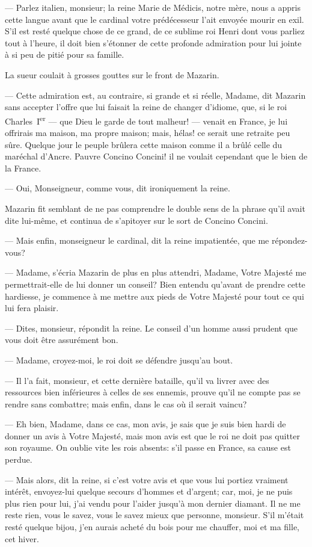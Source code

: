 — Parlez italien, monsieur; la reine Marie de Médicis, notre mère, nous a appris cette langue avant que le cardinal votre prédécesseur l'ait envoyée mourir en exil. S'il est resté quelque chose de ce grand, de ce sublime roi Henri dont vous parliez tout à l'heure, il doit bien s'étonner de cette profonde admiration pour lui jointe à si peu de pitié pour sa famille.

La sueur coulait à grosses gouttes sur le front de Mazarin.

— Cette admiration est, au contraire, si grande et si réelle, Madame, dit Mazarin sans accepter l'offre que lui faisait la reine de changer d'idiome, que, si le roi Charles~I\textsuperscript{er} — que Dieu le garde de tout malheur! — venait en France, je lui offrirais ma maison, ma propre maison; mais, hélas! ce serait une retraite peu sûre. Quelque jour le peuple brûlera cette maison comme il a brûlé celle du maréchal d'Ancre. Pauvre Concino Concini! il ne voulait cependant que le bien de la France.

— Oui, Monseigneur, comme vous, dit ironiquement la reine.

Mazarin fit semblant de ne pas comprendre le double sens de la phrase qu'il avait dite lui-même, et continua de s'apitoyer sur le sort de Concino Concini.

— Mais enfin, monseigneur le cardinal, dit la reine impatientée, que me répondez-vous?

— Madame, s'écria Mazarin de plus en plus attendri, Madame, Votre Majesté me permettrait-elle de lui donner un conseil? Bien entendu qu'avant de prendre cette hardiesse, je commence à me mettre aux pieds de Votre Majesté pour tout ce qui lui fera plaisir.

— Dites, monsieur, répondit la reine. Le conseil d'un homme aussi prudent que vous doit être assurément bon.

— Madame, croyez-moi, le roi doit se défendre jusqu'au bout.

— Il l'a fait, monsieur, et cette dernière bataille, qu'il va livrer avec des ressources bien inférieures à celles de ses ennemis, prouve qu'il ne compte pas se rendre sans combattre; mais enfin, dans le cas où il serait vaincu?

— Eh bien, Madame, dans ce cas, mon avis, je sais que je suis bien hardi de donner un avis à Votre Majesté, mais mon avis est que le roi ne doit pas quitter son royaume. On oublie vite les rois absents: s'il passe en France, sa cause est perdue.

— Mais alors, dit la reine, si c'est votre avis et que vous lui portiez vraiment intérêt, envoyez-lui quelque secours d'hommes et d'argent; car, moi, je ne puis plus rien pour lui, j'ai vendu pour l'aider jusqu'à mon dernier diamant. Il ne me reste rien, vous le savez, vous le savez mieux que personne, monsieur. S'il m'était resté quelque bijou, j'en aurais acheté du bois pour me chauffer, moi et ma fille, cet hiver.

